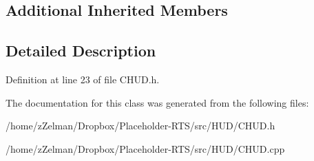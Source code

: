 \subsection*{Additional Inherited Members}


\subsection{Detailed Description}


Definition at line 23 of file C\-H\-U\-D.\-h.



The documentation for this class was generated from the following files\-:\begin{DoxyCompactItemize}
\item 
/home/z\-Zelman/\-Dropbox/\-Placeholder-\/\-R\-T\-S/src/\-H\-U\-D/C\-H\-U\-D.\-h\item 
/home/z\-Zelman/\-Dropbox/\-Placeholder-\/\-R\-T\-S/src/\-H\-U\-D/C\-H\-U\-D.\-cpp\end{DoxyCompactItemize}
